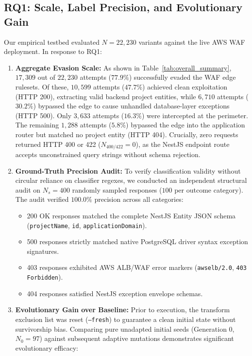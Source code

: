 \subsection{RQ1: Scale, Label Precision, and Evolutionary Gain}
Our empirical testbed evaluated $N=22{,}230$ variants against the live AWS WAF deployment. In response to RQ1:
\begin{enumerate}
  \item \textbf{Aggregate Evasion Scale:} As shown in Table~\ref{tab:overall_summary}, $17{,}309$ out of $22{,}230$ attempts ($77.9\%$) successfully evaded the WAF edge rulesets. Of these, $10{,}599$ attempts ($47.7\%$) achieved clean exploitation (HTTP 200), extracting valid backend project entities, while $6{,}710$ attempts ($30.2\%$) bypassed the edge to cause unhandled database-layer exceptions (HTTP 500). Only $3{,}633$ attempts ($16.3\%$) were intercepted at the perimeter. The remaining $1{,}288$ attempts ($5.8\%$) bypassed the edge into the application router but matched no project entity (HTTP 404). Crucially, zero requests returned HTTP 400 or 422 ($N_{400/422}=0$), as the NestJS endpoint route accepts unconstrained query strings without schema rejection.
  \item \textbf{Ground-Truth Precision Audit:} To verify classification validity without circular reliance on classifier regexes, we conducted an independent structural audit on $N_s=400$ randomly sampled responses ($100$ per outcome category). The audit verified $100.0\%$ precision across all categories:
  \begin{itemize}
    \item 200 OK responses matched the complete NestJS Entity JSON schema (\texttt{projectName}, \texttt{id}, \texttt{applicationDomain}).
    \item 500 responses strictly matched native PostgreSQL driver syntax exception signatures.
    \item 403 responses exhibited AWS ALB/WAF error markers (\texttt{awselb/2.0}, \texttt{403 Forbidden}).
    \item 404 responses satisfied NestJS exception envelope schemas.
  \end{itemize}
  \item \textbf{Evolutionary Gain over Baseline:} Prior to execution, the transform exclusion list was reset (\texttt{--fresh}) to guarantee a clean initial state without survivorship bias. Comparing pure unadapted initial seeds (Generation 0, $N_0=97$) against subsequent adaptive mutations demonstrates significant evolutionary efficacy:

\end{enumerate}
